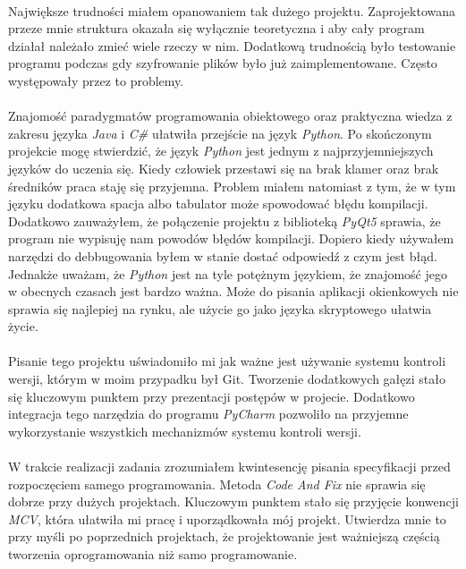 \documentclass[a4paper]{article}
\begin{document}
\paragraph{}
Największe trudności miałem opanowaniem tak dużego projektu. Zaprojektowana przeze mnie struktura okazała się wyłącznie teoretyczna i aby cały program działał należało zmieć wiele rzeczy w nim. Dodatkową trudnością było testowanie programu podczas gdy szyfrowanie plików było już zaimplementowane. Często występowały przez to problemy.
\paragraph{}
Znajomość paradygmatów programowania obiektowego oraz praktyczna wiedza z zakresu języka \textit{Java} i \textit{C#} ułatwiła przejście na język \textit{Python}. Po skończonym projekcie mogę stwierdzić, że język \textit{Python} jest jednym z najprzyjemniejszych języków do uczenia się. Kiedy człowiek przestawi się na brak klamer oraz brak średników praca staję się przyjemna. Problem miałem natomiast z tym, że w tym języku dodatkowa spacja albo tabulator może spowodować błędu kompilacji. Dodatkowo zauważyłem, że połączenie projektu z biblioteką \textit{PyQt5} sprawia, że program nie wypisuję nam powodów błędów kompilacji. Dopiero kiedy używałem narzędzi do debbugowania byłem w stanie dostać odpowiedź z czym jest błąd.\\
Jednakże uważam, że \textit{Python} jest na tyle potężnym językiem, że znajomość jego w obecnych czasach jest bardzo ważna. Może do pisania aplikacji okienkowych nie sprawia się najlepiej na rynku, ale użycie go jako języka skryptowego ułatwia życie.
\paragraph{}
Pisanie tego projektu uświadomiło mi jak ważne jest używanie systemu kontroli wersji, którym w moim przypadku był Git. Tworzenie dodatkowych gałęzi stało się kluczowym punktem przy prezentacji postępów w projecie. Dodatkowo integracja tego narzędzia do programu \textit{PyCharm} pozwoliło na przyjemne wykorzystanie wszystkich mechanizmów systemu kontroli wersji.
\paragraph{}
W trakcie realizacji zadania zrozumiałem kwintesencję pisania specyfikacji przed rozpoczęciem samego programowania. Metoda \textit{Code And Fix} nie sprawia się dobrze przy dużych projektach. Kluczowym punktem stało się przyjęcie konwencji \textit{MCV}, która ułatwiła mi pracę i uporządkowała mój projekt. Utwierdza mnie to przy myśli po poprzednich projektach, że projektowanie jest ważniejszą częścią tworzenia oprogramowania niż samo programowanie.
\label{end}
\end{document}
